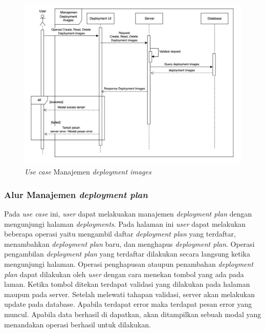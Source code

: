 \begin{figure}[ht]
  \centering
  \includegraphics[width=1\textwidth]{resources/chapter-3/usecase/uc-10.jpg}
  \caption{\textit{Use case} Manajemen \textit{deployment images}}
  \label{fig:usecase-10}
\end{figure}

\pagebreak

\subsubsection{Alur Manajemen \textit{deployment plan}}

Pada \textit{use case} ini, \textit{user} dapat melakuakan manajemen \textit{deployment plan} dengan mengunjungi halaman \textit{deployments}. Pada halaman ini \textit{user} dapat melakukan beberapa operasi yaitu mengambil daftar \textit{deployment plan} yang terdaftar, menambahkan \textit{deployment plan} baru, dan menghapus \textit{deployment plan}. Operasi pengambilan \textit{deployment plan} yang terdaftar dilakukan secara langsung ketika mengunjungi halaman. Operasi penghapusan ataupun penambahan \textit{deployment plan} dapat dilakukan oleh \textit{user} dengan cara menekan tombol yang ada pada laman. Ketika tombol ditekan terdapat validasi yang dilakukan pada halaman maupun pada server. Setelah melewati tahapan validasi, server akan melakukan update pada database. Apabila terdapat error maka terdapat pesan error yang muncul. Apabila data berhasil di dapatkan, akan ditampilkan sebuah modal yang menandakan operasi berhasil untuk dilakukan.

